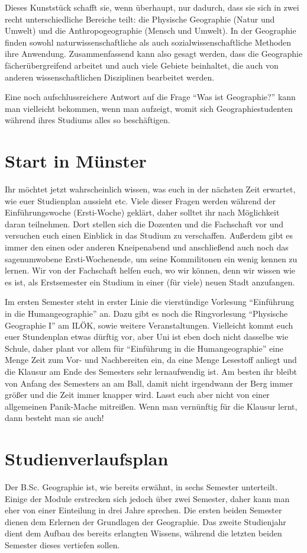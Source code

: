 Dieses Kunststück schafft sie, wenn überhaupt, nur dadurch, dass sie sich in zwei recht unterschiedliche Bereiche teilt: die Physische Geographie (Natur und Umwelt) und die Anthropogeographie (Mensch und Umwelt). In der Geographie ﬁnden sowohl naturwissenschaftliche als auch sozialwissenschaftliche Methoden ihre Anwendung. Zusammenfassend kann also gesagt werden, dass die Geographie fächerübergreifend arbeitet und auch viele Gebiete beinhaltet, die auch von anderen wissenschaftlichen Disziplinen bearbeitet werden.

Eine noch aufschlussreichere Antwort auf die Frage \enquote{Was ist Geographie?} kann man vielleicht bekommen, wenn man aufzeigt, womit sich Geographiestudenten während ihres Studiums alles so beschäftigen.

\section*{Start in Münster}
Ihr möchtet jetzt wahrscheinlich wissen, was euch in der nächsten Zeit erwartet, wie euer Studienplan aussieht etc. Viele dieser Fragen werden während der Einführungswoche (Ersti-Woche) geklärt, daher solltet ihr nach Möglichkeit daran teilnehmen. Dort stellen sich die Dozenten und die Fachschaft vor und versuchen euch einen Einblick in das Studium zu verschaffen. Außerdem gibt es immer den einen oder anderen Kneipenabend und anschließend auch noch das sagenumwobene Ersti-Wochenende, um seine Kommilitonen ein wenig kennen zu lernen. Wir von der Fachschaft helfen euch, wo wir können, denn wir wissen wie es ist, als Erstsemester ein Studium in einer (für viele) neuen Stadt anzufangen.

Im ersten Semester steht in erster Linie die vierstündige Vorlesung \enquote{Einführung in die Humangeographie} an. Dazu gibt es noch die Ringvorlesung \enquote{Physische Geographie I} am ILÖK, sowie weitere Veranstaltungen. Vielleicht kommt euch euer Stundenplan etwas dürftig vor, aber Uni ist eben doch nicht dasselbe wie Schule, daher plant vor allem für \enquote{Einführung in die Humangeographie} eine Menge Zeit zum Vor- und Nachbereiten ein, da eine Menge Lesestoff anliegt und die Klausur am Ende des Semesters sehr lernaufwendig ist. Am besten ihr bleibt von Anfang des Semesters an am Ball, damit nicht irgendwann der Berg immer größer und die Zeit immer knapper wird. Lasst euch aber nicht von einer allgemeinen Panik-Mache mitreißen. Wenn man vernünftig für die Klausur lernt, dann besteht man sie auch!

\section{Studienverlaufsplan}
Der B.Sc. Geographie ist, wie bereits erwähnt, in sechs Semester unterteilt. Einige der Module erstrecken sich jedoch über zwei Semester, daher kann man eher von einer Einteilung in drei Jahre sprechen. Die ersten beiden Semester dienen dem Erlernen der Grundlagen der Geographie. Das zweite Studienjahr dient dem Aufbau des bereits erlangten Wissens, während die letzten beiden Semester dieses vertiefen sollen.

